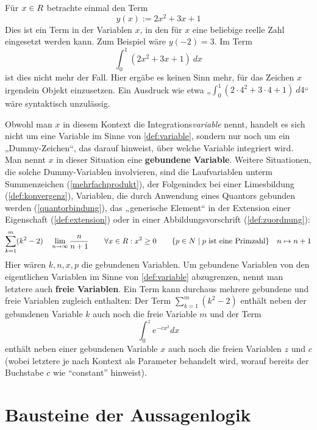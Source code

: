 \begin{nota} \label{gebundenevariable}  
    Für $x\in\relax R$ betrachte einmal den Term
        \[ y(x):=2x^2+3x+1 \]
    Dies ist ein Term in der Variablen $x$, in den für $x$ eine beliebige reelle Zahl eingesetzt werden kann. Zum Beispiel wäre $y(-2)=3$. Im Term
        \[ \int_0^1 (2x^2+3x+1)\ dx\]
    ist dies nicht mehr der Fall. Hier ergäbe es keinen Sinn mehr, für das Zeichen $x$ irgendein Objekt einzusetzen. Ein Ausdruck wie etwa „$\int_0^1 (2\cdot 4^2+3\cdot 4+1)\ d4$“ wäre syntaktisch unzulässig.

    Obwohl man $x$ in diesem Kontext die Integrations\emph{variable} nennt, handelt es sich nicht um eine Variable im Sinne von \cref{def:variable}, sondern nur noch um ein „Dummy-Zeichen“, das darauf hinweist, über welche Variable integriert wird. Man nennt $x$ in dieser Situation eine \textbf{gebundene Variable}. Weitere Situationen, die solche Dummy-Variablen involvieren, sind die Laufvariablen unterm Summenzeichen (\cref{mehrfachprodukt}), der Folgenindex bei einer Limesbildung (\cref{def:konvergenz}), Variablen, die durch Anwendung eines Quantors gebunden werden (\cref{quantorbindung}), das „generische Element“ in der Extension einer Eigenschaft (\cref{def:extension}) oder in einer Abbildungsvorschrift (\cref{def:zuordnung}):
        \[ \sum_{k=1}^m (k^2-2) \quad \lim_{n\to \infty} \frac{n}{n+1} \qquad \forall x\in\R: x^2\ge 0 \qquad \{p\in \N \mid p\ \text{ist eine Primzahl}\} \quad n\mapsto n+1 \]
    Hier wären $k,n,x,p$ die gebundenen Variablen. Um gebundene Variablen von den eigentlichen Variablen im Sinne von \cref{def:variable} abzugrenzen, nennt man letztere auch \textbf{freie Variablen}. Ein Term kann durchaus mehrere gebundene und freie Variablen zugleich enthalten: Der Term $\sum_{k=1}^m(k^2-2)$ enthält neben der gebundenen Variable $k$ auch noch die freie Variable $m$ und der Term
        \[ \int_0^z e^{-cx^2} dx \]
    enthält neben einer gebundenen Variable $x$ auch noch die freien Variablen $z$ und $c$ (wobei letztere je nach Kontext als Parameter behandelt wird, worauf bereits der Buchstabe $c$ wie ``constant'' hinweist).
\end{nota}





\section{Bausteine der Aussagenlogik} \label{sec:aussagenlogik}


